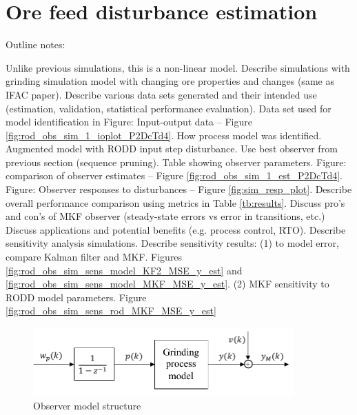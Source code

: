 \section{Ore feed disturbance estimation} \label{section:sim-ore-SISO}

Outline notes:
\begin{outline}
	\1 Unlike previous simulations, this is a non-linear model.
	\1 Describe simulations with grinding simulation model with changing ore properties and changes (same as IFAC paper).
	\1 Describe various data sets generated and their intended use (estimation, validation, statistical performance evaluation).
	\1 Data set used for model identification in Figure: Input-output data – Figure \ref{fig:rod_obs_sim_1_ioplot_P2DcTd4}.
	\1 How process model was identified.
	\1 Augmented model with \gls{RODD} input step disturbance.
	\1 Use best observer from previous section (sequence pruning).
	\1 Table showing observer parameters.
	\1 Figure: comparison of observer estimates – Figure \ref{fig:rod_obs_sim_1_est_P2DcTd4}.
	\1 Figure: Observer responses to disturbances – Figure \ref{fig:sim_resp_plot}.
	\1 Describe overall performance comparison using metrics in Table \ref{tb:results}.
	\1 Discuss pro's and con's of MKF observer (steady-state errors vs error in transitions, etc.)
	\1 Discuss applications and potential benefits (e.g. process control, RTO).
	\1 Describe sensitivity analysis simulations.
	\1 Describe sensitivity results:
	\2 (1) to model error, compare Kalman filter and MKF. Figures \ref{fig:rod_obs_sim_sens_model_KF2_MSE_y_est} and \ref{fig:rod_obs_sim_sens_model_MKF_MSE_y_est}.
	\2 (2) MKF sensitivity to \gls{RODD} model parameters. Figure  \ref{fig:rod_obs_sim_sens_rod_MKF_MSE_y_est}
\end{outline}

\begin{figure}[htp]
	\centering
	\includegraphics[width=10cm]{images/obs-model-diag.pdf}
	\caption{Observer model structure}
	\label{fig:obs_model}
\end{figure}

